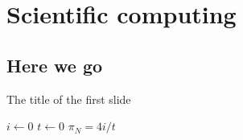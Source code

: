%
%
%
%


\section{Scientific computing}

\subsection{Here we go}
\begin{frame}{The title of the first slide}

    \normalsize
    \begin{algorithm}[H]
      \dontprintsemicolon
      $i \leftarrow 0$ \;
      $t \leftarrow 0$ \;
      $\pi_{N} = 4 i/t \;$ %
    \end{algorithm}
%
\end{frame}

